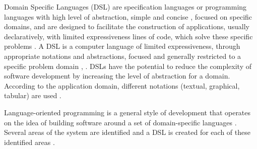 
Domain Specific Languages (DSL) are specification languages or programming languages with high level of abstraction, simple and concise \cite{raja2010}, focused on specific domains, and are designed to facilitate the construction of applications, usually declaratively, with limited expressiveness lines of code, which solve these specific problems \cite{neeraj2017}. A DSL is a computer language of limited expressiveness, through appropriate notations and abstractions, focused and generally restricted to a specific problem domain \cite{fowler2013}, \cite{vanDeursen2000}. DSLs have the potential to reduce the complexity of software development by increasing the level of abstraction for a domain. According to the application domain, different notations (textual, graphical, tabular) are used \cite{pfeiffer2008}.


Language-oriented programming is a general style of development that operates on the idea of building software around a set of domain-specific languages \cite{fowler2005}. Several areas of the system are identified and a DSL is created for each of these identified areas \cite{fowler2008}.


